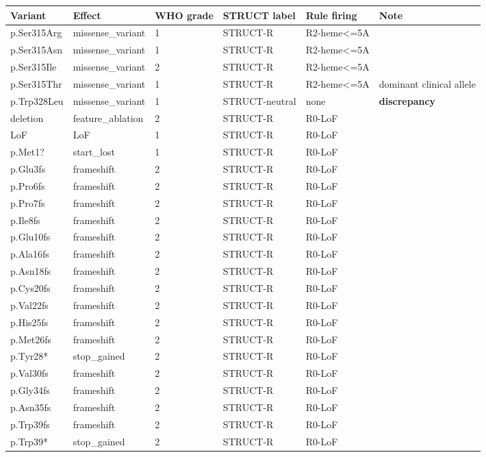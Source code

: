 \begin{footnotesize}
\begin{longtable}{llllll}
\hline
Variant & Effect & WHO grade & STRUCT label & Rule firing & Note\\\hline
\endhead
p.Ser315Arg & missense\_variant & 1 & STRUCT-R & R2-heme<=5A & \\
p.Ser315Asn & missense\_variant & 1 & STRUCT-R & R2-heme<=5A & \\
p.Ser315Ile & missense\_variant & 2 & STRUCT-R & R2-heme<=5A & \\
p.Ser315Thr & missense\_variant & 1 & STRUCT-R & R2-heme<=5A & dominant clinical allele\\
p.Trp328Leu & missense\_variant & 1 & STRUCT-neutral & none & \textbf{discrepancy}\\
deletion & feature\_ablation & 2 & STRUCT-R & R0-LoF & \\
LoF & LoF & 1 & STRUCT-R & R0-LoF & \\
p.Met1? & start\_lost & 1 & STRUCT-R & R0-LoF & \\
p.Glu3fs & frameshift & 2 & STRUCT-R & R0-LoF & \\
p.Pro6fs & frameshift & 2 & STRUCT-R & R0-LoF & \\
p.Pro7fs & frameshift & 2 & STRUCT-R & R0-LoF & \\
p.Ile8fs & frameshift & 2 & STRUCT-R & R0-LoF & \\
p.Glu10fs & frameshift & 2 & STRUCT-R & R0-LoF & \\
p.Ala16fs & frameshift & 2 & STRUCT-R & R0-LoF & \\
p.Asn18fs & frameshift & 2 & STRUCT-R & R0-LoF & \\
p.Cys20fs & frameshift & 2 & STRUCT-R & R0-LoF & \\
p.Val22fs & frameshift & 2 & STRUCT-R & R0-LoF & \\
p.His25fs & frameshift & 2 & STRUCT-R & R0-LoF & \\
p.Met26fs & frameshift & 2 & STRUCT-R & R0-LoF & \\
p.Tyr28* & stop\_gained & 2 & STRUCT-R & R0-LoF & \\
p.Val30fs & frameshift & 2 & STRUCT-R & R0-LoF & \\
p.Gly34fs & frameshift & 2 & STRUCT-R & R0-LoF & \\
p.Asn35fs & frameshift & 2 & STRUCT-R & R0-LoF & \\
p.Trp39fs & frameshift & 2 & STRUCT-R & R0-LoF & \\
p.Trp39* & stop\_gained & 2 & STRUCT-R & R0-LoF & \\

\end{longtable}
\end{footnotesize}

